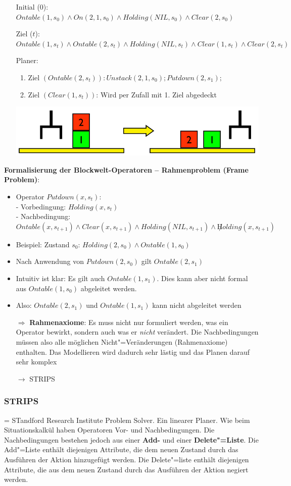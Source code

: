 \begin{itemize}
	\item[] Initial (0): $Ontable(1, s_0) \land On(2, 1, s_0) \land Holding(NIL, s_0) \land Clear(2, s_0)$
	\item[] Ziel ($t$): $Ontable(1, s_t) \land Ontable(2, s_t) \land Holding(NIL, s_t) \land Clear(1, s_t) \land Clear(2, s_t)$
	\item[] Planer:
	\begin{enumerate}
		\item Ziel $(Ontable(2,s_t)): Unstack(2, 1, s_0); Putdown(2, s_1);$
		\item Ziel $(Clear(1, s_t))$: Wird per Zufall mit 1. Ziel abgedeckt 
	\end{enumerate}
	\includegraphics[width=.5\textwidth]{figures/ch06_bw-bsp}
\end{itemize}
\textbf{Formalisierung der Blockwelt-Operatoren -- Rahmenproblem (Frame Problem)}:
\begin{itemize}
	\item Operator $Putdown(x, s_t)$:\\
		- Vorbedingung: $Holding(x, s_t)$\\
		- Nachbedingung: $Ontable(x, s_{t+1}) \land Clear (x, s_{t+1} ) \land Holding(NIL, s_{t+1} ) \land \not Holding(x, s_{t+1})$
	\item Beispiel: Zustand $s_0$: $Holding(2, s_0) \land Ontable(1, s_0)$
	\item Nach Anwendung von $Putdown(2, s_0)$ gilt $Ontable(2, s_1)$
	\item Intuitiv ist klar: Es gilt auch $Ontable(1, s_1)$. Dies kann aber nicht formal aus $Ontable(1, s_0)$ abgeleitet werden.
	\item Also: $Ontable(2, s_1)$ und $Ontable(1, s_1)$ kann nicht abgeleitet werden
	\item[$\Rightarrow$] \textbf{Rahmenaxiome}: Es muss nicht nur formuliert werden, was ein Operator bewirkt, sondern auch was er \textit{nicht} verändert. Die Nachbedingungen müssen also alle möglichen Nicht"=Veränderungen (Rahmenaxiome) enthalten. Das Modellieren wird dadurch sehr lästig und das Planen darauf sehr komplex 
	\item[$\rightarrow$] STRIPS
\end{itemize}
\subsubsection{STRIPS}
= STandford Research Institute Problem Solver.
Ein linearer Planer.
Wie beim Situationskalkül haben Operatoren Vor- und Nachbedingungen.
Die Nachbedingungen bestehen jedoch aus einer \textbf{Add-} und einer \textbf{Delete"=Liste}.
Die Add"=Liste enthält diejenigen Attribute, die dem neuen Zustand durch das Ausführen der Aktion hinzugefügt werden.
Die Delete"=liste enthält diejenigen Attribute, die aus dem neuen Zustand durch das Ausführen der Aktion negiert werden.\\

